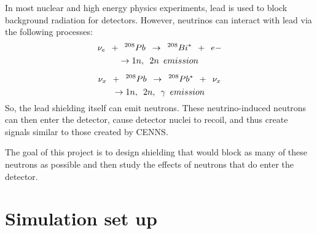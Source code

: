 \documentclass[12pt]{article}
\begin{document}
In most nuclear and high energy physics experiments, lead is used to block background radiation for detectors. However, neutrinos can interact with lead via the following processes\cite{ppt}:
$$\nu_{e}\hspace{0.5em}+\hspace{0.5em}^{208}Pb\hspace{0.5em}\rightarrow\hspace{0.5em}^{208}Bi^{*}\hspace{0.5em}+\hspace{0.5em}e-$$ $$\rightarrow 1n,\hspace{0.5em}2n\hspace{0.5em}emission$$

$$\nu_{x}\hspace{0.5em}+\hspace{0.5em}^{208}Pb\hspace{0.5em}\rightarrow\hspace{0.5em}^{208}Pb^{*}\hspace{0.5em}+\hspace{0.5em}\nu_{x}$$ $$\rightarrow 1n,\hspace{0.5em}2n,\hspace{0.5em}\gamma\hspace{0.5em}emission$$
So, the lead shielding itself can emit neutrons. These neutrino-induced neutrons can then enter the detector, cause detector nuclei to recoil, and thus create signals similar to those created by CENNS. 

The goal of this project is to design shielding that would block as many of these neutrons as possible and then study the effects of neutrons that do enter the detector.

\section{Simulation set up}
\end{document}
